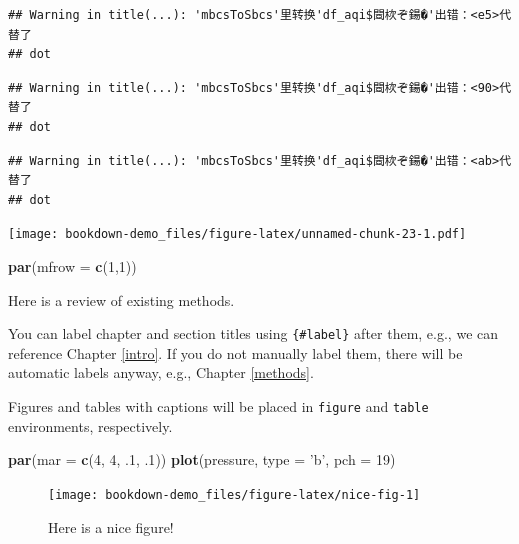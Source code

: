 \documentclass[]{book}
\newenvironment{Shaded}{\begin{snugshade}}{\end{snugshade}}
\newcommand{\DataTypeTok}[1]{\textcolor[rgb]{0.13,0.29,0.53}{#1}}
\newcommand{\DecValTok}[1]{\textcolor[rgb]{0.00,0.00,0.81}{#1}}
\newcommand{\FloatTok}[1]{\textcolor[rgb]{0.00,0.00,0.81}{#1}}
\newcommand{\KeywordTok}[1]{\textcolor[rgb]{0.13,0.29,0.53}{\textbf{#1}}}
\newcommand{\NormalTok}[1]{#1}
\newcommand{\StringTok}[1]{\textcolor[rgb]{0.31,0.60,0.02}{#1}}
\begin{document}
\begin{verbatim}
## Warning in title(...): 'mbcsToSbcs'里转换'df_aqi$閸栨ぞ鍚�'出错：<e5>代替了
## dot
\end{verbatim}

\begin{verbatim}
## Warning in title(...): 'mbcsToSbcs'里转换'df_aqi$閸栨ぞ鍚�'出错：<90>代替了
## dot
\end{verbatim}

\begin{verbatim}
## Warning in title(...): 'mbcsToSbcs'里转换'df_aqi$閸栨ぞ鍚�'出错：<ab>代替了
## dot
\end{verbatim}

\texttt{[image: bookdown-demo\_files/figure-latex/unnamed-chunk-23-1.pdf]}

\begin{Shaded}
\begin{Highlighting}[]
\KeywordTok{par}\NormalTok{(}\DataTypeTok{mfrow =} \KeywordTok{c}\NormalTok{(}\DecValTok{1}\NormalTok{,}\DecValTok{1}\NormalTok{))}
\end{Highlighting}
\end{Shaded}

Here is a review of existing methods.

You can label chapter and section titles using \texttt{\{\#label\}} after them, e.g., we can reference Chapter \ref{intro}. If you do not manually label them, there will be automatic labels anyway, e.g., Chapter \ref{methods}.

Figures and tables with captions will be placed in \texttt{figure} and \texttt{table} environments, respectively.

\begin{Shaded}
\begin{Highlighting}[]
\KeywordTok{par}\NormalTok{(}\DataTypeTok{mar =} \KeywordTok{c}\NormalTok{(}\DecValTok{4}\NormalTok{, }\DecValTok{4}\NormalTok{, }\FloatTok{.1}\NormalTok{, }\FloatTok{.1}\NormalTok{))}
\KeywordTok{plot}\NormalTok{(pressure, }\DataTypeTok{type =} \StringTok{'b'}\NormalTok{, }\DataTypeTok{pch =} \DecValTok{19}\NormalTok{)}
\end{Highlighting}
\end{Shaded}

\begin{figure}

{\centering \texttt{[image: bookdown-demo\_files/figure-latex/nice-fig-1]} 

}

\caption{Here is a nice figure!}\label{fig:nice-fig}
\end{figure}
\end{document}
